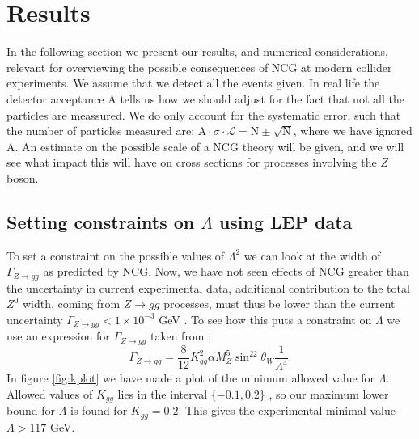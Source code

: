 \section{Results}
In the following section we present our results, and numerical considerations, relevant for overviewing the possible consequences of NCG at modern collider experiments. We assume that we detect all the events given. In real life the detector acceptance A tells us how we should adjust for the fact that not all the particles are meassured. We do only account for the systematic error, such that the number of particles measured are: $\textrm{A} \cdot \sigma\cdot \mathcal{L}=\textrm{N} \pm \sqrt{\textrm{N} }$, where we have ignored A. An estimate on the possible scale of a NCG theory will be given, and we will see what impact this will have on cross sections for processes involving the $Z$ boson.

\subsection{Setting constraints on $\Lambda$ using LEP data}
To set a constraint on the possible values of $\Lambda^2$ we can look at the width of $\Gamma_{Z \rightarrow gg}$ as predicted by NCG. Now, we have not seen effects of NCG greater than the uncertainty in current experimental data, additional contribution to the total $Z^0$ width, coming from $Z \rightarrow gg$ processes, must thus be lower than the current uncertainty $\Gamma_{Z \rightarrow gg} < 1 \times 10^{-3}$ GeV \cite{behr2003dnc}. To see how this puts a constraint on $\Lambda$ we use an expression for $\Gamma_{Z \rightarrow gg}$ taken from \cite{behr2003dnc};
\begin{equation} \label{eq:zggwidth}
	\Gamma_{Z \rightarrow gg} = \frac{8}{12} K_{gg}^2 \alpha M_Z^5 \sin^22\theta_W \frac{1}{\Lambda^4}.
\end{equation}
In figure \ref{fig:kplot} we have made a plot of the minimum allowed value for $\Lambda$. Allowed values of $K_{gg}$ lies in the interval $\{-0.1,0.2\}$ \cite{behr2003dnc}, so our maximum lower bound for $\Lambda$ is found for $K_{gg}=0.2$. This gives the experimental minimal value $\Lambda >117$ GeV.

